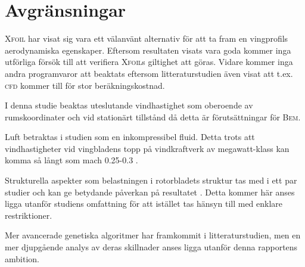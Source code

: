 \begin{comment}Det stora antalet sätt att representera vingprofiler är en produkt av att tidigare författare försökt hitta representationer med så få parametrar som möjligt utan för den delen inskränka designrymden. Detta 


\rework{Python är ett kraftfullt, enkelt programmeringsspråk med högt pedagogiskt värde då koden är lättläst även för den som inte kan Python. Att använda Python som programmeringsspråk är därmed ett medvetet val där det till skillnad från t.ex. \textsc{MatLab} även är helt öppet. En kommersiell licens för \textsc{MatLab} kostar idag 17 500 \citep{MATLAB} vilket begränsar tillgången för de utan medel. Mitt program kommer därför vara helt oförknippat med några kostnader.}

\end{comment}

\section{Avgränsningar}
\textsc{Xfoil} har visat sig vara ett välanvänt alternativ för att ta fram en vingprofils aerodynamiska egenskaper. Eftersom resultaten visats vara goda kommer inga utförliga försök till att verifiera \textsc{Xfoil}s giltighet att göras. Vidare kommer inga andra programvaror att beaktats eftersom litteraturstudien även visat att t.ex. \textsc{cfd} kommer till för stor beräkningskostnad.

I denna studie beaktas uteslutande vindhastighet som oberoende av rumskoordinater och vid stationärt tillstånd då detta är förutsättningar för \textsc{Bem}. 

Luft betraktas i studien som en inkompressibel fluid. Detta trots att vindhastigheter vid vingbladens topp på vindkraftverk av megawatt-klass kan komma så långt som mach 0.25-0.3 \citep{XfoilVerifikation}.

Strukturella aspekter som belastningen i rotorbladets struktur tas med i ett par studier och kan ge betydande påverkan på resultatet \citep{5MWkillen, Victoria}. Detta kommer här anses ligga utanför studiens omfattning för att istället tas hänsyn till med enklare restriktioner.

Mer avancerade genetiska algoritmer har framkommit i litteraturstudien, men en mer djupgående analys av deras skillnader anses ligga utanför denna rapportens ambition.



